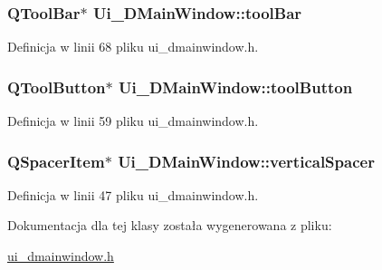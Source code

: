 \subsubsection[{tool\+Bar}]{\setlength{\rightskip}{0pt plus 5cm}Q\+Tool\+Bar$\ast$ Ui\+\_\+\+D\+Main\+Window\+::tool\+Bar}\label{class_ui___d_main_window_abba1dae1dd835c7a7dd39da623cd4580}


Definicja w linii 68 pliku ui\+\_\+dmainwindow.\+h.

\hypertarget{class_ui___d_main_window_a97093acead8089d7f4b26fab4b1c8a65}{}
\subsubsection[{tool\+Button}]{\setlength{\rightskip}{0pt plus 5cm}Q\+Tool\+Button$\ast$ Ui\+\_\+\+D\+Main\+Window\+::tool\+Button}\label{class_ui___d_main_window_a97093acead8089d7f4b26fab4b1c8a65}


Definicja w linii 59 pliku ui\+\_\+dmainwindow.\+h.

\hypertarget{class_ui___d_main_window_a476471e78bf431c7487fa9e0afadb76d}{}
\subsubsection[{vertical\+Spacer}]{\setlength{\rightskip}{0pt plus 5cm}Q\+Spacer\+Item$\ast$ Ui\+\_\+\+D\+Main\+Window\+::vertical\+Spacer}\label{class_ui___d_main_window_a476471e78bf431c7487fa9e0afadb76d}


Definicja w linii 47 pliku ui\+\_\+dmainwindow.\+h.



Dokumentacja dla tej klasy została wygenerowana z pliku\+:\begin{DoxyCompactItemize}
\item 
\hyperlink{ui__dmainwindow_8h}{ui\+\_\+dmainwindow.\+h}\end{DoxyCompactItemize}
